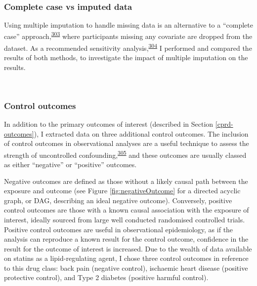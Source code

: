 \documentclass[a4paper, twoside]{templates/ociamthesis}
\begin{document}
~

\hypertarget{complete-case-vs-imputed-data}{%
\subsubsection{Complete case vs imputed data}\label{complete-case-vs-imputed-data}}

Using multiple imputation to handle missing data is an alternative to a ``complete case'' approach,\textsuperscript{\protect\hyperlink{ref-pigott2001}{303}} where participants missing any covariate are dropped from the dataset. As a recommended sensitivity analysis,\textsuperscript{\protect\hyperlink{ref-hughes2019}{304}} I performed and compared the results of both methods, to investigate the impact of multiple imputation on the results.

~

\hypertarget{control-outcomes}{%
\subsubsection{Control outcomes}\label{control-outcomes}}

In addition to the primary outcomes of interest (described in Section \ref{cprd-outcomes}), I extracted data on three additional control outcomes. The inclusion of control outcomes in observational analyses are a useful technique to assess the strength of uncontrolled confounding,\textsuperscript{\protect\hyperlink{ref-lipsitch2010}{305}} and these outcomes are usually classed as either ``negative'' or ``positive'' outcomes.

Negative outcomes are defined as those without a likely causal path between the exposure and outcome (see Figure \ref{fig:negativeOutcome} for a directed acyclic graph, or DAG, describing an ideal negative outcome). Conversely, positive control outcomes are those with a known causal association with the exposure of interest, ideally sourced from large well conducted randomised controlled trials. Positive control outcomes are useful in observational epidemiology, as if the analysis can reproduce a known result for the control outcome, confidence in the result for the outcome of interest is increased. Due to the wealth of data available on statins as a lipid-regulating agent, I chose three control outcomes in reference to this drug class: back pain (negative control), ischaemic heart disease (positive protective control), and Type 2 diabetes (positive harmful control).

~\\
\end{document}
